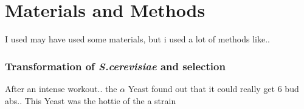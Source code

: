 
\chapter{Materials and Methods}
I used may have used some materials, but i used a lot of methods
\newline
like..

\subsection{Transformation of \textit{S.cerevisiae} and selection}\label{hefetrafo}
After an intense workout.. the $\alpha$ Yeast found out that it could really get 6 bud abs.. This Yeast was the hottie of the a strain\\